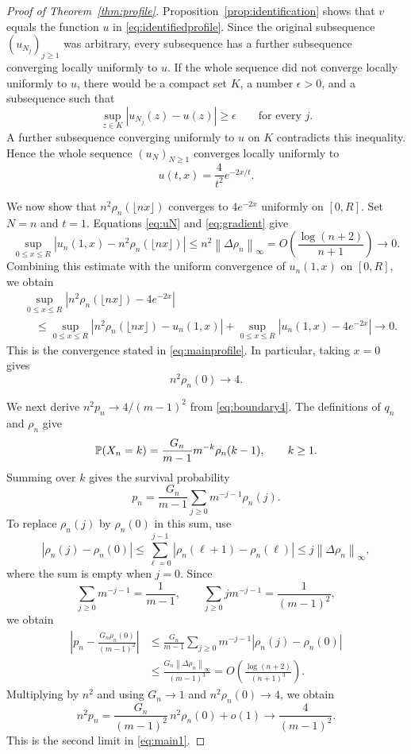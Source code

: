 \documentclass[11pt,letterpaper,reqno]{amsart}
\numberwithin{equation}{section}
\theoremstyle{plain}
\theoremstyle{remark}
\newcommand{\norm}[1]{\left\lVert#1\right\rVert}
\newcommand{\floor}[1]{\lfloor#1\rfloor}
\begin{document}
\begin{proof}[Proof of Theorem~\ref{thm:profile}]
Proposition~\ref{prop:identification} shows that $v$ equals the function $u$ in \eqref{eq:identifiedprofile}. Since the original subsequence $(u_{N_j})_{j\ge1}$ was arbitrary, every subsequence has a further subsequence converging locally uniformly to $u$. If the whole sequence did not converge locally uniformly to $u$, there would be a compact set $K$, a number $\epsilon>0$, and a subsequence such that
\[
 \sup_{z\in K}|u_{N_j}(z)-u(z)|\ge\epsilon\qquad\text{for every }j.
\]
A further subsequence converging uniformly to $u$ on $K$ contradicts this inequality. Hence the whole sequence $(u_N)_{N\ge1}$ converges locally uniformly to
\[ u(t,x)=\frac4{t^2}e^{-2x/t}.\]

We now show that $n^2\rho_n(\floor{nx})$ converges to $4e^{-2x}$ uniformly on $[0,R]$. Set $N=n$ and $t=1$. Equations \eqref{eq:uN} and \eqref{eq:gradient} give
\[
 \sup_{0\le x\le R}
 \left|u_n(1,x)-n^2\rho_n(\floor{nx})\right|
 \le n^2\norm{\Delta\rho_n}_\infty
 =O\left(\frac{\log(n+2)}{n+1}\right)\longrightarrow0.
\]
Combining this estimate with the uniform convergence of $u_n(1,x)$ on $[0,R]$, we obtain
\[
 \begin{split}
 &\sup_{0\le x\le R}\left|n^2\rho_n(\floor{nx})-4e^{-2x}\right|\\
 &\quad\le \sup_{0\le x\le R}\left|n^2\rho_n(\floor{nx})-u_n(1,x)\right|
       +\sup_{0\le x\le R}\left|u_n(1,x)-4e^{-2x}\right|
 \longrightarrow0.
 \end{split}
\]
This is the convergence stated in \eqref{eq:mainprofile}. In particular, taking $x=0$ gives
\begin{equation}\label{eq:boundary4}
 n^2\rho_n(0)\longrightarrow4.
\end{equation}

We next derive $n^2p_n\to4/(m-1)^2$ from \eqref{eq:boundary4}. The definitions of $q_n$ and $\rho_n$ give
\[
 \mathbb P(X_n=k)=\frac{G_n}{m-1}m^{-k}\rho_n(k-1),
 \qquad k\ge1.
\]
Summing over $k$ gives the survival probability
\begin{equation*}
 p_n=\frac{G_n}{m-1}\sum_{j\ge0}m^{-j-1}\rho_n(j).
\end{equation*}
To replace $\rho_n(j)$ by $\rho_n(0)$ in this sum, use
\[
 |\rho_n(j)-\rho_n(0)|
 \le\sum_{\ell=0}^{j-1}|\rho_n(\ell+1)-\rho_n(\ell)|
 \le j\norm{\Delta\rho_n}_\infty,
\]
where the sum is empty when $j=0$. Since
\[
 \sum_{j\ge0}m^{-j-1}=\frac1{m-1},
 \qquad
 \sum_{j\ge0}jm^{-j-1}=\frac1{(m-1)^2},
\]
we obtain
\[
 \begin{split}
 \left|p_n-\frac{G_n\rho_n(0)}{(m-1)^2}\right|
 &\le\frac{G_n}{m-1}
       \sum_{j\ge0}m^{-j-1}|\rho_n(j)-\rho_n(0)|\\
 &\le\frac{G_n\norm{\Delta\rho_n}_\infty}{(m-1)^3}
 =O\left(\frac{\log(n+2)}{(n+1)^3}\right).
 \end{split}
\]
Multiplying by $n^2$ and using $G_n\to1$ and $n^2\rho_n(0)\to4$, we obtain
\[
 n^2p_n=\frac{G_n}{(m-1)^2}\,n^2\rho_n(0)+o(1)
 \longrightarrow\frac4{(m-1)^2}.
\]
This is the second limit in \eqref{eq:main1}.


\end{proof}
\end{document}
